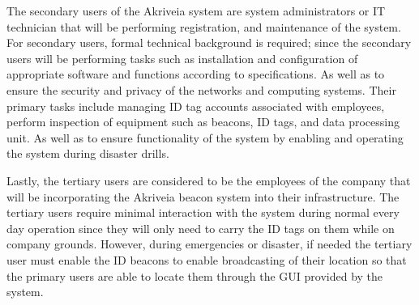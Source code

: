 \bigskip
The secondary users of the Akriveia system are system administrators or IT technician that will be 
performing registration, and maintenance of the system. For secondary users, formal technical background is required; since the secondary users will be performing tasks such as installation and configuration of appropriate software and functions according to specifications. As well as to ensure the security and privacy of the networks and computing systems. Their primary tasks include managing ID tag accounts associated with employees, perform inspection of equipment such as beacons, ID tags, and data processing unit. As well as to ensure functionality of the system by enabling and operating the system during disaster drills. 

\bigskip
Lastly, the tertiary users are considered to be the employees of the company that will be incorporating the Akriveia beacon system into their infrastructure. The tertiary users require minimal interaction with the system during normal every day operation since they will only need to carry the ID tags on them while on company grounds. However, during emergencies or disaster, if needed the tertiary user must enable the ID beacons to enable broadcasting of their location so that the primary users are able to locate them through the GUI provided by the system.





